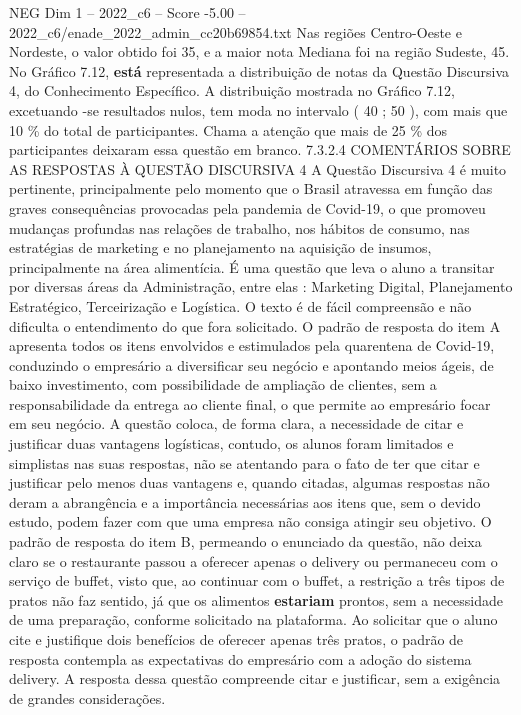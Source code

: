 \begin{textsample}{NEG Dim 1 – 2022\_c6 – Score -5.00 – 2022\_c6/enade\_2022\_admin\_cc20b69854.txt}
Nas regiões Centro-Oeste e Nordeste, o valor obtido foi 35, e a maior nota Mediana foi na região Sudeste, 45.
No Gráfico 7.12, \textbf{está} representada a distribuição de notas da Questão Discursiva 4, do Conhecimento Específico.
A distribuição mostrada no Gráfico 7.12, excetuando -se resultados nulos, tem moda no intervalo ( 40 ; 50 ), com mais que 10 \% do total de participantes.
Chama a atenção que mais de 25 \% dos participantes deixaram essa questão em branco. 7.3.2.4 COMENTÁRIOS SOBRE AS RESPOSTAS À QUESTÃO DISCURSIVA 4 A Questão Discursiva 4 é muito pertinente, principalmente pelo momento que o Brasil atravessa em função das graves consequências provocadas pela pandemia de Covid-19, o que promoveu mudanças profundas nas relações de trabalho, nos hábitos de consumo, nas estratégias de marketing e no planejamento na aquisição de insumos, principalmente na área alimentícia.
É uma questão que leva o aluno a transitar por diversas áreas da Administração, entre elas : Marketing Digital, Planejamento Estratégico, Terceirização e Logística.
O texto é de fácil compreensão e não dificulta o entendimento do que fora solicitado.
O padrão de resposta do item A apresenta todos os itens envolvidos e estimulados pela quarentena de Covid-19, conduzindo o empresário a diversificar seu negócio e apontando meios ágeis, de baixo investimento, com possibilidade de ampliação de clientes, sem a responsabilidade da entrega ao cliente final, o que permite ao empresário focar em seu negócio.
A questão coloca, de forma clara, a necessidade de citar e justificar duas vantagens logísticas, contudo, os alunos foram limitados e simplistas nas suas respostas, não se atentando para o fato de ter que citar e justificar pelo menos duas vantagens e, quando citadas, algumas respostas não deram a abrangência e a importância necessárias aos itens que, sem o devido estudo, podem fazer com que uma empresa não consiga atingir seu objetivo.
O padrão de resposta do item B, permeando o enunciado da questão, não deixa claro se o restaurante passou a oferecer apenas o delivery ou permaneceu com o serviço de buffet, visto que, ao continuar com o buffet, a restrição a três tipos de pratos não faz sentido, já que os alimentos \textbf{estariam} prontos, sem a necessidade de uma preparação, conforme solicitado na plataforma.
Ao solicitar que o aluno cite e justifique dois benefícios de oferecer apenas três pratos, o padrão de resposta contempla as expectativas do empresário com a adoção do sistema delivery.
A resposta dessa questão compreende citar e justificar, sem a exigência de grandes considerações.

\end{textsample}

